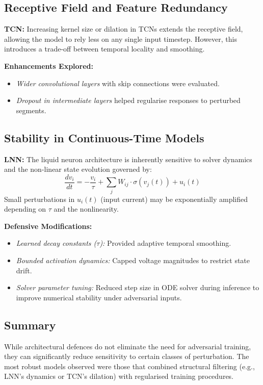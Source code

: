 \subsection{Receptive Field and Feature Redundancy}

\textbf{TCN:} Increasing kernel size or dilation in TCNs extends the receptive field, allowing the model to rely less on any single input timestep. However, this introduces a trade-off between temporal locality and smoothing.

\textbf{Enhancements Explored:}
\begin{itemize}
    \item \textit{Wider convolutional layers} with skip connections were evaluated.
    \item \textit{Dropout in intermediate layers} helped regularise responses to perturbed segments.
\end{itemize}

\subsection{Stability in Continuous-Time Models}

\textbf{LNN:} The liquid neuron architecture is inherently sensitive to solver dynamics and the non-linear state evolution governed by:
\[
\frac{dv_i}{dt} = -\frac{v_i}{\tau} + \sum_j W_{ij} \cdot \sigma(v_j(t)) + u_i(t)
\]
Small perturbations in $u_i(t)$ (input current) may be exponentially amplified depending on $\tau$ and the nonlinearity.

\textbf{Defensive Modifications:}
\begin{itemize}
    \item \textit{Learned decay constants ($\tau$):} Provided adaptive temporal smoothing.
    \item \textit{Bounded activation dynamics:} Capped voltage magnitudes to restrict state drift.
    \item \textit{Solver parameter tuning:} Reduced step size in ODE solver during inference to improve numerical stability under adversarial inputs.
\end{itemize}

\subsection{Summary}

While architectural defences do not eliminate the need for adversarial training, they can significantly reduce sensitivity to certain classes of perturbation. The most robust models observed were those that combined structural filtering (e.g., LNN’s dynamics or TCN’s dilation) with regularised training procedures.

